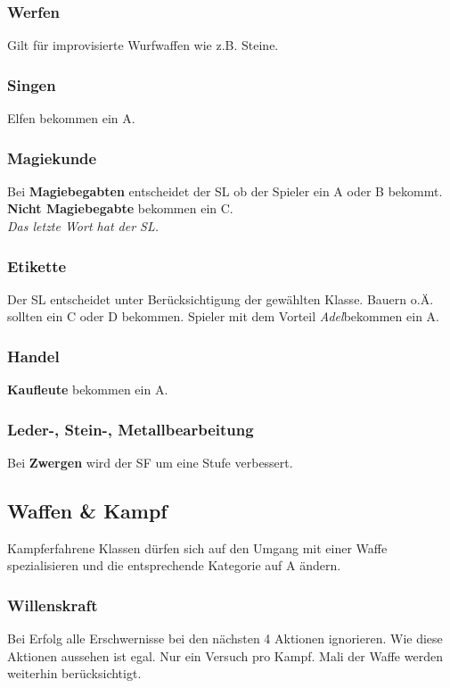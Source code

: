 \subsubsection{Werfen}
Gilt für improvisierte Wurfwaffen wie z.B. Steine.

\subsubsection{Singen}
Elfen bekommen ein A.

\subsubsection{Magiekunde}
Bei \textbf{Magiebegabten} entscheidet der SL ob der Spieler ein A oder B bekommt. \\
\textbf{Nicht Magiebegabte} bekommen ein C. \\
\textit{Das letzte Wort hat der SL.}

\subsubsection{Etikette}
Der SL entscheidet unter Berücksichtigung der gewählten Klasse. Bauern o.Ä. sollten ein C oder D bekommen. Spieler mit dem Vorteil \textit{Adel}\footnotemark[4] bekommen ein A.

\subsubsection{Handel}
\textbf{Kaufleute} bekommen ein A.

\subsubsection{Leder-, Stein-, Metallbearbeitung}
Bei \textbf{Zwergen} wird der SF um eine Stufe verbessert. 

\subsection{Waffen \& Kampf}
\label{chap:waffen_und_kampf}
Kampferfahrene Klassen dürfen sich auf den Umgang mit einer Waffe spezialisieren und die entsprechende Kategorie auf A ändern.

\subsubsection{Willenskraft}
Bei Erfolg alle Erschwernisse bei den nächsten 4 Aktionen ignorieren. Wie diese Aktionen aussehen ist egal. Nur ein Versuch pro Kampf. Mali der Waffe werden weiterhin berücksichtigt.

